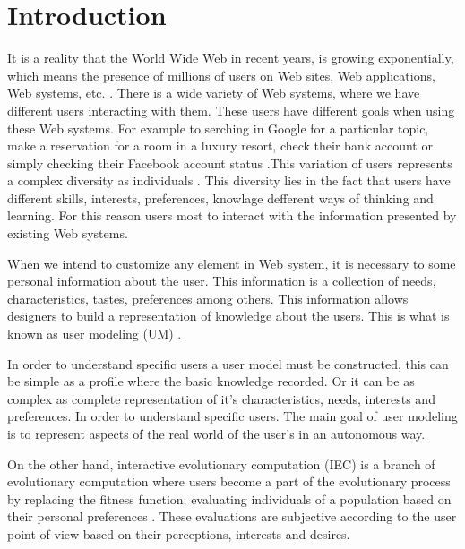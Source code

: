\chapter{Introduction} \label{introduction}


\par It is a reality that the World Wide Web in recent years, is growing
exponentially, which means the presence of millions of users on Web sites, Web
applications, Web systems, etc. \cite{albert1999internet}. There is a wide
variety of Web systems, where we have different users interacting with them.
These users have different goals when using these Web systems. For example to
serching  in Google \cite{google} for a particular topic, make a reservation for
a room in a luxury resort, check their bank account or simply checking their
Facebook account status \cite{cockburn2001web}.This variation of users
represents a complex diversity as individuals \cite{zhao2006internet}. This
diversity lies in the fact that users have different skills, interests,
preferences, knowlage defferent  ways of thinking and learning. For this reason
users most to interact with the information presented by existing Web systems.
\par When we intend to customize any element in Web system,  it is necessary to
some personal information about the user. This information is a collection of
needs, characteristics, tastes, preferences among others.  This information
allows designers to build a representation of knowledge about the users. This is
what is known as user modeling (UM) \cite{razmerita2009user} \cite{fischer2001user}
.

\par  In order to understand specific users a user model must be constructed,
this can be simple as a profile where the basic knowledge recorded. Or it can be
as complex as complete representation of it's characteristics, needs, interests
and preferences. In order to understand specific users. The main goal of user
modeling is to represent aspects of the real world of the user's in an
autonomous way.

\par On the other hand, interactive evolutionary computation (IEC)
is a branch of evolutionary computation where users become a part of the
evolutionary process by replacing the fitness function; evaluating individuals
of a population based on their personal preferences
\cite{takagi2001interactive}. These evaluations are subjective according to the
user point of view based on their perceptions, interests and desires.

